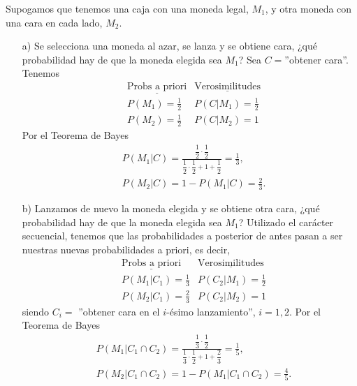 \begin{ejemplo}
    Supogamos que tenemos una caja con una moneda legal, $M_1$, y otra moneda con una cara en cada lado, $M_2$.
    \begin{enumerate}
        \item[a)] Se selecciona una moneda al azar, se lanza y se obtiene cara, ¿qué probabilidad hay de que la moneda elegida sea $M_1$? Sea $C=$''obtener cara''. Tenemos
        \begin{align*}
            &\underline{\text{Probs a priori}} &\underline{\text{Verosimilitudes}} \\
            & P(M_1) = \frac{1}{2} & P(C | M_1) = \frac{1}{2}\\
            & P(M_2) = \frac{1}{2} & P(C | M_2) = 1
        \end{align*}
        Por el Teorema de Bayes
        \begin{align*}
            &P(M_1 | C) = \frac{\dfrac{1}{2} \cdot \dfrac{1}{2}}{\dfrac{1}{2} \cdot \dfrac{1}{2} + 1 + \dfrac{1}{2}} = \frac{1}{3}, \\
            &P(M_2 | C) = 1 - P(M_1 | C) = \frac{2}{3}.
        \end{align*}
        \item[b)] Lanzamos de nuevo la moneda elegida y se obtiene otra cara, ¿qué probabilidad hay de que la moneda elegida sea $M_1$? Utilizado el carácter secuencial, tenemos que las probabilidades a posterior de antes pasan a ser nuestras nuevas probabilidades a priori, es decir,
                \begin{align*}
            &\underline{\text{Probs a priori}} &\underline{\text{Verosimilitudes}} \\
            & P(M_1|C_1) = \frac{1}{3} & P(C_2 | M_1) = \frac{1}{2}\\
            & P(M_2|C_1) = \frac{2}{3} & P(C_2 | M_2) = 1
        \end{align*}
        siendo $C_i =$ ''obtener cara en el $i$-ésimo lanzamiento'', $i=1,2$. Por el Teorema de Bayes
        \begin{align*}
            &P(M_1 | C_1 \cap C_2) = \frac{\dfrac{1}{3} \cdot \dfrac{1}{2}}{\dfrac{1}{3} \cdot \dfrac{1}{2} + 1 + \dfrac{2}{3}} = \frac{1}{5}, \\
            &P(M_2 | C_1 \cap C_2) = 1 - P(M_1 | C_1 \cap C_2) = \frac{4}{5}.
        \end{align*}
    \end{enumerate}
\end{ejemplo}

